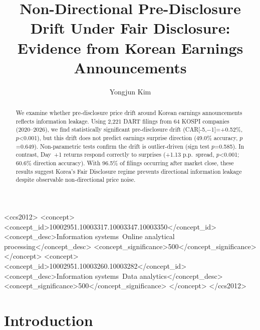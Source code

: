 \documentclass[manuscript,review,anonymous]{acmart}
\begin{document}
\title{Non-Directional Pre-Disclosure Drift Under Fair Disclosure: Evidence from Korean Earnings Announcements}

\author{Yongjun Kim}

\begin{abstract}
We examine whether pre-disclosure price drift around Korean earnings announcements reflects information leakage. Using 2,221 DART filings from 64 KOSPI companies (2020--2026), we find statistically significant pre-disclosure drift (CAR[-5,$-$1]=+0.52\%, $p$<0.001), but this drift does not predict earnings surprise direction (49.0\% accuracy, $p$=0.649). Non-parametric tests confirm the drift is outlier-driven (sign test $p$=0.585). In contrast, Day~+1 returns respond correctly to surprises (+1.13 p.p.\ spread, $p$<0.001; 60.6\% direction accuracy). With 96.5\% of filings occurring after market close, these results suggest Korea's Fair Disclosure regime prevents directional information leakage despite observable non-directional price noise.
\end{abstract}

\begin{CCSXML}
<ccs2012>
<concept>
<concept_id>10002951.10003317.10003347.10003350</concept_id>
<concept_desc>Information systems~Online analytical processing</concept_desc>
<concept_significance>500</concept_significance>
</concept>
<concept>
<concept_id>10002951.10003260.10003282</concept_id>
<concept_desc>Information systems~Data analytics</concept_desc>
<concept_significance>500</concept_significance>
</concept>
</ccs2012>
\end{CCSXML}



\maketitle

\section{Introduction}
\end{document}
